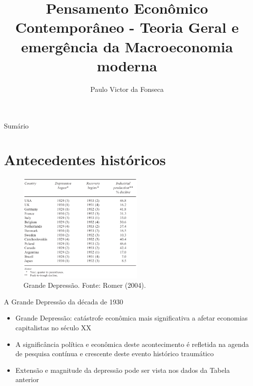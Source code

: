 \documentclass[10pt]{beamer}
\title[]{Pensamento Econômico Contemporâneo - Teoria Geral e emergência da Macroeconomia moderna}
\author[]{Paulo Victor da Fonseca}
\date{}
\begin{document}
\begin{frame}[plain]
\end{frame}

\begin{frame}{Sumário}
    \tableofcontents
\end{frame}

\section{Antecedentes históricos}

\begin{frame}
    \begin{figure}
        \centering
        \includegraphics[width=0.55\textwidth]{./figures/aula4_fig0}
        \caption{Grande Depressão. Fonte: Romer (2004).}
        \label{aula4_fig0}
    \end{figure}
\end{frame}

\begin{frame}{A Grande Depressão da década de 1930}
    \begin{itemize}
        \item Grande Depressão: catástrofe econômica mais significativa a afetar economias capitalistas no século XX
        \bigskip
        \item A significância política e econômica deste acontecimento é refletida na agenda de pesquisa contínua e crescente deste evento histórico traumático
        \bigskip
        \item Extensão e magnitude da depressão pode ser vista nos dados da Tabela anterior
    \end{itemize}
\end{frame}
\end{document}
